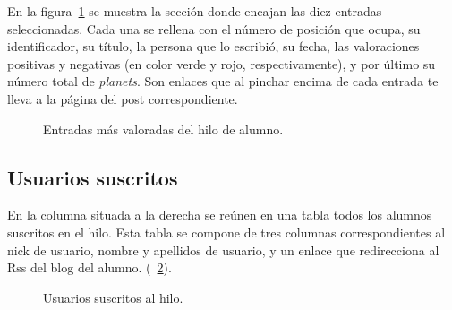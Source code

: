 \documentclass[a4paper, 12pt]{book}
\begin{document}
En la figura~\ref{figura:hiloalumno3} se muestra la secci\'on donde encajan las diez entradas seleccionadas. Cada una se rellena con el n\'umero de 
posici\'on que ocupa, su identificador, su t\'itulo, la persona que lo escribi\'o, su fecha, las valoraciones positivas y negativas (en color verde y rojo,
respectivamente), y por \'ultimo su n\'umero total de \textit{planets}. Son enlaces que al pinchar encima de cada entrada te lleva a la p\'agina del post 
correspondiente.
\begin{figure}[htbp] 
  \centering
  \caption{Entradas m\'as valoradas del hilo de alumno.}
  \label{figura:hiloalumno3}
\end{figure}

\subsection{Usuarios suscritos}
En la columna situada a la derecha se re\'unen en una tabla todos los alumnos suscritos en el hilo. Esta tabla se compone de tres columnas correspondientes
al nick de usuario, nombre y apellidos de usuario, y un enlace que redirecciona al Rss del blog del alumno. 
(~\ref{figura:hiloalumno4}).
\begin{figure}[htbp] 
  \centering
  \caption{Usuarios suscritos al hilo.}
  \label{figura:hiloalumno4}
\end{figure}
\end{document}
